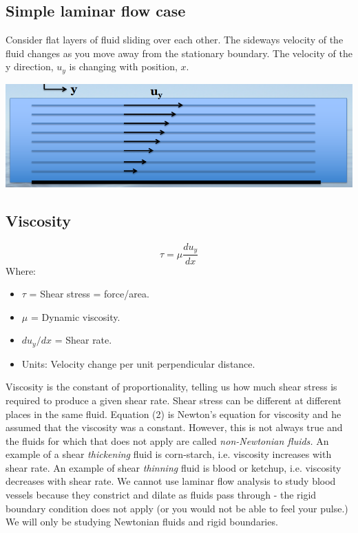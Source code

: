 \documentclass[class=report, crop=false, 12pt,a4paper]{standalone}
\begin{document}
\subsection{Simple laminar flow case}
Consider flat layers of fluid sliding over each other. The sideways velocity of the fluid changes as you move away from the stationary boundary. The velocity of the y direction, \( u_y \) is changing with position, \( x\). 

\begin{center}
  \includegraphics[width = 1 \textwidth]{../img/LaminarFlowSimple}
\end{center}

\subsection{Viscosity}
\begin{equation}
  \tau = \mu \frac{du_y}{dx}
\end{equation}
Where:
\begin{multicols}{2}
  \begin{itemize}[noitemsep]
    \item \(\tau \) = Shear stress = force/area.
    \item \(\mu \) = Dynamic viscosity.
    \item \( du_y / dx \) = Shear rate.
    \item Units: Velocity change per unit perpendicular distance.
  \end{itemize}
\end{multicols}
Viscosity is the constant of proportionality, telling us how much shear stress is required to produce a given shear rate. Shear stress can be different at different places in the same fluid. Equation (2) is Newton's equation for viscosity and he assumed that the viscosity was a constant. However, this is not always true and the fluids for which that does not apply are called \emph{non-Newtonian fluids.} An example of a shear \emph{thickening} fluid is corn-starch, i.e. viscosity increases with shear rate. An example of shear \emph{thinning} fluid is blood or ketchup, i.e. viscosity decreases with shear rate. We cannot use laminar flow analysis to study blood vessels because they constrict and dilate as fluids pass through - the rigid boundary condition does not apply (or you would not be able to feel your pulse.) We will only be studying Newtonian fluids and rigid boundaries.
\end{document}
